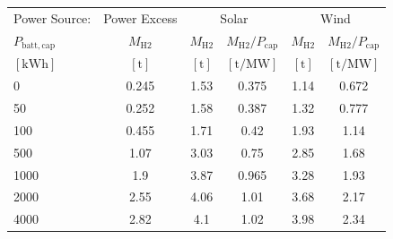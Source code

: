 \begin{table}
\label{tab: VaryBattery}
\begin{tabular}{l|c|cc|cc}
\toprule
Power Source: & Power Excess & \multicolumn{2}{|c}{Solar} & \multicolumn{2}{|c}{Wind} \\
$P_{\mathrm{batt,cap}}$ & $M_{\mathrm{H2}}$ & $M_{\mathrm{H2}}$ & $M_{\mathrm{H2}}/P_{\mathrm{cap}}$ & $M_{\mathrm{H2}}$ & $M_{\mathrm{H2}}/P_{\mathrm{cap}}$ \\
$\left[\mathrm{kWh}\right]$ & $\left[\mathrm{t}\right]$ & $\left[\mathrm{t}\right]$ & $\left[\mathrm{t/MW}\right]$ & $\left[\mathrm{t}\right]$ & $\left[\mathrm{t/MW}\right]$ \\
\midrule
0 & 0.245 & 1.53 & 0.375 & 1.14 & 0.672 \\
50 & 0.252 & 1.58 & 0.387 & 1.32 & 0.777 \\
100 & 0.455 & 1.71 & 0.42 & 1.93 & 1.14 \\
500 & 1.07 & 3.03 & 0.75 & 2.85 & 1.68 \\
1000 & 1.9 & 3.87 & 0.965 & 3.28 & 1.93 \\
2000 & 2.55 & 4.06 & 1.01 & 3.68 & 2.17 \\
4000 & 2.82 & 4.1 & 1.02 & 3.98 & 2.34 \\
\bottomrule
\end{tabular}
\end{table}
